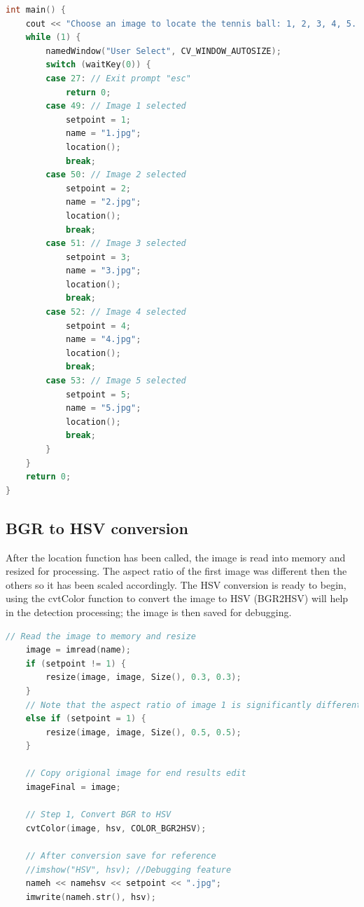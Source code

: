 \documentclass[a4paper, 10pt]{article}
\begin{document}
\begin{lstlisting}[language = C++]
int main() {
	cout << "Choose an image to locate the tennis ball: 1, 2, 3, 4, 5...\n\npress esc to quit\n\n-------------------------------------------------------------------------\n" << endl;
	while (1) {
		namedWindow("User Select", CV_WINDOW_AUTOSIZE);
		switch (waitKey(0)) {
		case 27: // Exit prompt "esc"
			return 0;
		case 49: // Image 1 selected
			setpoint = 1;
			name = "1.jpg";
			location();
			break;
		case 50: // Image 2 selected
			setpoint = 2;
			name = "2.jpg";
			location();
			break;
		case 51: // Image 3 selected
			setpoint = 3;
			name = "3.jpg";
			location();
			break;
		case 52: // Image 4 selected
			setpoint = 4;
			name = "4.jpg";
			location();
			break;
		case 53: // Image 5 selected
			setpoint = 5;
			name = "5.jpg";
			location();
			break;
		}
	}
	return 0;
}
\end{lstlisting}

\clearpage
\subsection{BGR to HSV conversion}

After the location function has been called, the image is read into memory and resized for processing. The aspect ratio of the first image was different then the others so it has been scaled accordingly. The HSV conversion is ready to begin, using the cvtColor function to convert the image to HSV (BGR2HSV) will help in the detection processing; the image is then saved for debugging.

\begin{lstlisting}[language = C++]
	// Read the image to memory and resize
	image = imread(name);
	if (setpoint != 1) {
		resize(image, image, Size(), 0.3, 0.3);
	}
	// Note that the aspect ratio of image 1 is significantly different than the others, these values provide better results
	else if (setpoint = 1) {
		resize(image, image, Size(), 0.5, 0.5);
	}

	// Copy origional image for end results edit
	imageFinal = image;

	// Step 1, Convert BGR to HSV
	cvtColor(image, hsv, COLOR_BGR2HSV);

	// After conversion save for reference
	//imshow("HSV", hsv); //Debugging feature
	nameh << namehsv << setpoint << ".jpg";
	imwrite(nameh.str(), hsv);
\end{lstlisting}
\end{document}

